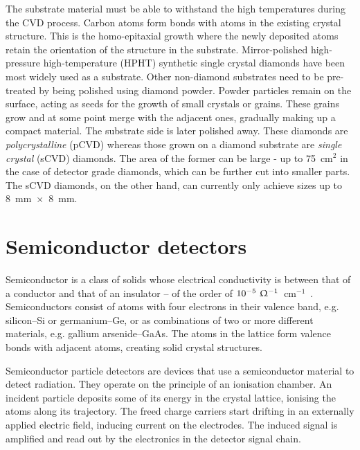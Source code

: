 \begin{description}
The substrate material must be able to withstand the high temperatures during the CVD process. Carbon atoms form bonds with atoms in the existing crystal structure. This is the homo-epitaxial growth where the newly deposited atoms retain the orientation of the structure in the substrate. Mirror-polished high-pressure high-temperature (HPHT) synthetic single crystal diamonds have been most widely used as a substrate. Other non-diamond substrates need to be pre-treated by being polished using diamond powder. Powder particles remain on the surface, acting as seeds for the growth of small crystals or grains. These grains grow and at some point merge with the adjacent ones, gradually making up a compact material. The substrate side is later polished away. These diamonds are \emph{polycrystalline} (pCVD) whereas those grown on a diamond substrate are \emph{single crystal} (sCVD) diamonds. The area of the former can be large - up to 75~cm$^2$ in the case of detector grade diamonds, which can be further cut into smaller parts. The sCVD diamonds, on the other hand, can currently only achieve sizes up to 8~mm~$\times$~8~mm.
\end{description}




\section{Semiconductor detectors}
Semiconductor is a class of solids whose electrical conductivity is between that of a conductor and that of an insulator -- of the order of  $10^{-5}~\Upomega^{-1}$~cm$^{-1}$~\cite{PHSEM:00000}. Semiconductors consist of atoms with four electrons in their valence band, e.g. silicon--Si or germanium--Ge, or as combinations of two or more different materials, e.g. gallium arsenide--GaAs. The atoms in the lattice form valence bonds with adjacent atoms, creating solid crystal structures.

Semiconductor particle detectors are devices that use a semiconductor material to detect radiation. They operate on the principle of an ionisation chamber. An incident particle deposits some of its energy in the crystal lattice, ionising the atoms along its trajectory. 
The freed charge carriers start drifting in an externally applied electric field, inducing current on the electrodes. The induced signal is amplified and read out by the electronics in the detector signal chain.

